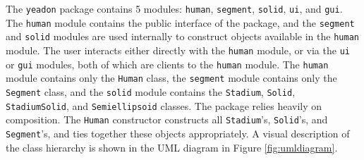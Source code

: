 \documentclass[10pt,a4paper,twocolumn]{article}
\begin{document}
The \verb+yeadon+ package contains 5 modules: \verb+human+, \verb+segment+,
\verb+solid+, \verb+ui+, and \verb+gui+. The \verb+human+ module contains the
public interface of the package, and the \verb+segment+ and \verb+solid+
modules are used internally to construct objects available in the \verb+human+
module. The user interacts either directly with the \verb+human+ module, or via
the \verb+ui+ or \verb+gui+ modules, both of which are clients to the
\verb+human+ module. The \verb+human+ module contains only the \verb+Human+
class, the \verb+segment+ module contains only the \verb+Segment+ class, and
the \verb+solid+ module contains the \verb+Stadium+, \verb+Solid+,
\verb+StadiumSolid+, and \verb+Semiellipsoid+ classes. The package relies
heavily on composition. The \verb+Human+ constructor constructs all
\verb+Stadium+'s, \verb+Solid+'s, and \verb+Segment+'s, and ties together these
objects appropriately. A visual description of the class hierarchy is shown in
the UML diagram in Figure \ref{fig:umldiagram}.
\end{document}
